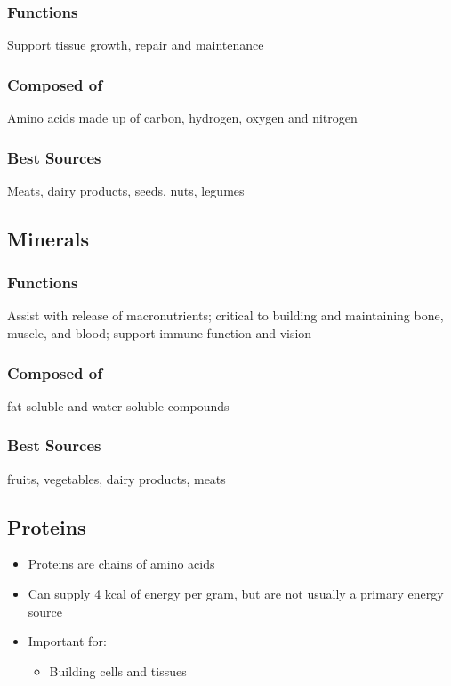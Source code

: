 \documentclass[title={Chapter 1}]{fdsn201notes}
\begin{document}
\subsubsection{Functions} Support tissue growth, repair and maintenance

\subsubsection{Composed of} Amino acids made up of carbon, hydrogen, oxygen and nitrogen

\subsubsection{Best Sources} Meats, dairy products, seeds, nuts, legumes

\textcolor{nutrientred}{\subsection{Minerals}\label{subsec:minerals}}
\subsubsection{Functions} Assist with release of macronutrients; critical to building and maintaining bone, muscle, and blood; support immune function and vision

\subsubsection{Composed of} fat-soluble and water-soluble compounds

\subsubsection{Best Sources} fruits, vegetables, dairy products, meats

\textcolor{nutrientpurple}{\subsection{Proteins}\label{subsec:proteins}}
\begin{itemize}
	\item Proteins are chains of amino acids
	\item Can supply 4 kcal of energy per gram, but are not usually a primary energy source
	\item Important for:
	\begin{itemize}
		\item Building cells and tissues
	\end{itemize}
\end{itemize}
\end{document}
